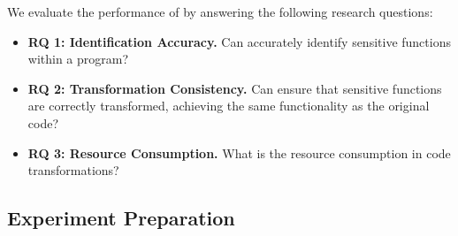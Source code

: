 We evaluate the performance of \system by answering the following research questions:

\begin{itemize}[leftmargin=*]
\item \textbf{RQ 1: Identification Accuracy.} Can \system accurately identify sensitive functions within a program?

\item \textbf{RQ 2: Transformation Consistency.} Can \system ensure that sensitive functions are correctly transformed, achieving the same functionality as the original code?

\item \textbf{RQ 3: Resource Consumption.} What is the resource consumption in code transformations?


\end{itemize}
\subsection{Experiment Preparation}

